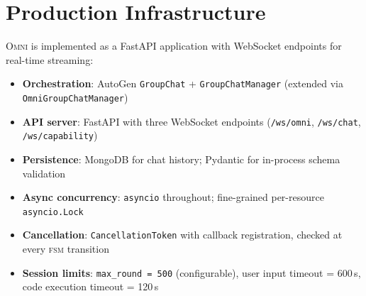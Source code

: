\documentclass[11pt,a4paper]{article}
\newcommand{\omni}{\textsc{Omni}}
\newcommand{\fsm}{\textsc{fsm}}
\begin{document}
\section{Production Infrastructure}
\label{app:infra}

\omni{} is implemented as a FastAPI application with WebSocket endpoints for real-time streaming:

\begin{itemize}[topsep=2pt, itemsep=1pt]
  \item \textbf{Orchestration}: AutoGen \texttt{GroupChat} + \texttt{GroupChatManager} (extended via \texttt{OmniGroupChatManager})
  \item \textbf{API server}: FastAPI with three WebSocket endpoints (\texttt{/ws/omni}, \texttt{/ws/chat}, \texttt{/ws/capability})
  \item \textbf{Persistence}: MongoDB for chat history; Pydantic for in-process schema validation
  \item \textbf{Async concurrency}: \texttt{asyncio} throughout; fine-grained per-resource \texttt{asyncio.Lock}
  \item \textbf{Cancellation}: \texttt{CancellationToken} with callback registration, checked at every \fsm{} transition
  \item \textbf{Session limits}: \texttt{max\_round = 500} (configurable), user input timeout = 600\,s, code execution timeout = 120\,s
\end{itemize}
\end{document}
